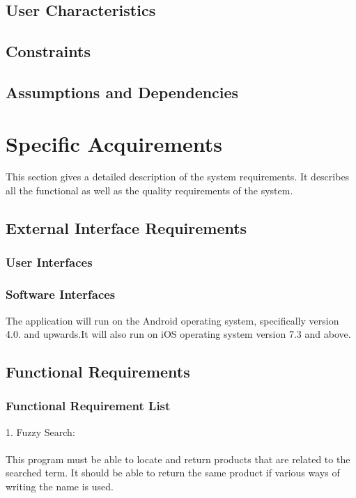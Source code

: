 \documentclass[a4paper,10pt]{article}
\begin{document}
	\subsection{User Characteristics}

	\subsection{Constraints}

	\subsection{Assumptions and Dependencies}

		
	\section{Specific Acquirements}
This section gives a detailed description of the system requirements. It describes all the functional as well as the quality requirements of the system.

	\subsection{External Interface Requirements}

                 \subsubsection{User Interfaces}

                 \subsubsection{Software Interfaces}
The application will run on the Android operating system, specifically version 4.0. and upwards.It will also run on iOS operating system version 7.3 and above.

	\subsection{Functional Requirements}
	\subsubsection{Functional Requirement List} 
	1.	Fuzzy Search:\\\\
	This program must be able to locate and return products that are related to the searched term. It should be able to return the 	same product if various ways of writing the name is used.\\\\
	
\end{document}
